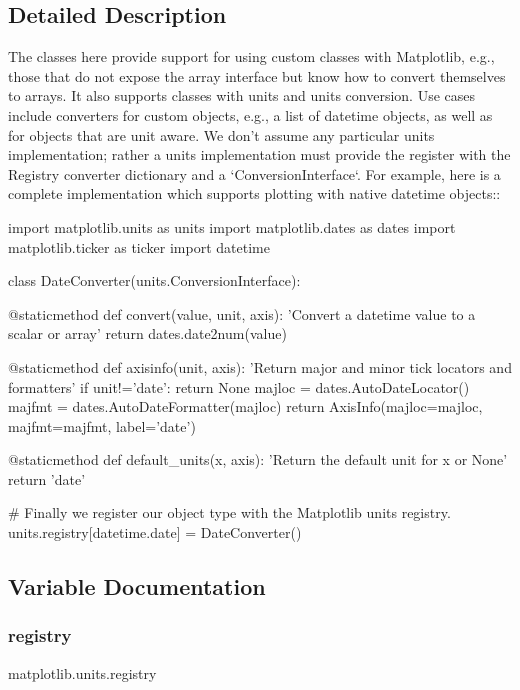 \subsection{Detailed Description}
\begin{DoxyVerb}The classes here provide support for using custom classes with
Matplotlib, e.g., those that do not expose the array interface but know
how to convert themselves to arrays.  It also supports classes with
units and units conversion.  Use cases include converters for custom
objects, e.g., a list of datetime objects, as well as for objects that
are unit aware.  We don't assume any particular units implementation;
rather a units implementation must provide the register with the Registry
converter dictionary and a `ConversionInterface`.  For example,
here is a complete implementation which supports plotting with native
datetime objects::

    import matplotlib.units as units
    import matplotlib.dates as dates
    import matplotlib.ticker as ticker
    import datetime

    class DateConverter(units.ConversionInterface):

        @staticmethod
        def convert(value, unit, axis):
            'Convert a datetime value to a scalar or array'
            return dates.date2num(value)

        @staticmethod
        def axisinfo(unit, axis):
            'Return major and minor tick locators and formatters'
            if unit!='date': return None
            majloc = dates.AutoDateLocator()
            majfmt = dates.AutoDateFormatter(majloc)
            return AxisInfo(majloc=majloc,
                            majfmt=majfmt,
                            label='date')

        @staticmethod
        def default_units(x, axis):
            'Return the default unit for x or None'
            return 'date'

    # Finally we register our object type with the Matplotlib units registry.
    units.registry[datetime.date] = DateConverter()\end{DoxyVerb}
 

\subsection{Variable Documentation}
\mbox{\label{namespacematplotlib_1_1units_ab9af5252a5410c8dc4d43410dbb8ac0e}} 
\subsubsection{\texorpdfstring{registry}{registry}}
{\footnotesize\ttfamily matplotlib.\+units.\+registry}

